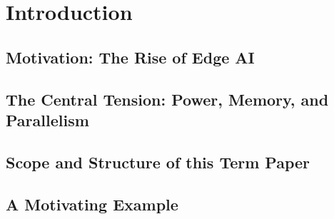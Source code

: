 \chapter{Introduction}
\label{ch:introduction}


\section{Motivation: The Rise of Edge AI}

\section{The Central Tension: Power, Memory, and Parallelism}

\section{Scope and Structure of this Term Paper}

\section{A Motivating Example}
